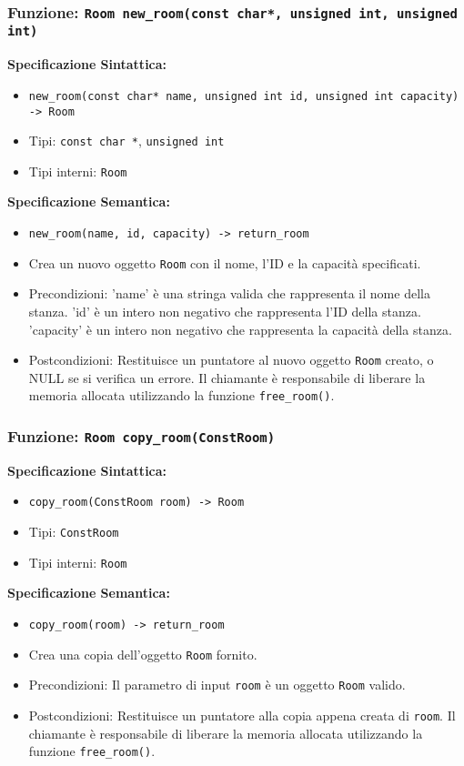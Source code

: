 \documentclass[11pt]{scrartcl} %
\begin{document}
\subsubsection{Funzione: \texttt{Room new\_room(const char*, unsigned int, unsigned int)}}

\textbf{Specificazione Sintattica:}
\begin{itemize}
	\item \texttt{new\_room(const char* name, unsigned int id, unsigned int capacity) -> Room}
	\item Tipi: \texttt{const char *}, \texttt{unsigned int}
	\item Tipi interni: \texttt{Room}
\end{itemize}

\textbf{Specificazione Semantica:}
\begin{itemize}
	\item \texttt{new\_room(name, id, capacity) -> return\_room}
	\item Crea un nuovo oggetto \texttt{Room} con il nome, l'ID e la capacità specificati.
	\item Precondizioni: 'name' è una stringa valida che rappresenta il nome della stanza. 'id' è un intero non negativo che rappresenta l'ID della stanza. 'capacity' è un intero non negativo che rappresenta la capacità della stanza.
	\item Postcondizioni: Restituisce un puntatore al nuovo oggetto \texttt{Room} creato, o NULL se si verifica un errore. Il chiamante è responsabile di liberare la memoria allocata utilizzando la funzione \texttt{free\_room()}.
\end{itemize}

\subsubsection{Funzione: \texttt{Room copy\_room(ConstRoom)}}

\textbf{Specificazione Sintattica:}
\begin{itemize}
	\item \texttt{copy\_room(ConstRoom room) -> Room}
	\item Tipi: \texttt{ConstRoom}
	\item Tipi interni: \texttt{Room}
\end{itemize}

\textbf{Specificazione Semantica:}
\begin{itemize}
	\item \texttt{copy\_room(room) -> return\_room}
	\item Crea una copia dell'oggetto \texttt{Room} fornito.
	\item Precondizioni: Il parametro di input \texttt{room} è un oggetto \texttt{Room} valido.
	\item Postcondizioni: Restituisce un puntatore alla copia appena creata di \texttt{room}. Il chiamante è responsabile di liberare la memoria allocata utilizzando la funzione \texttt{free\_room()}.
\end{itemize}
\end{document}
